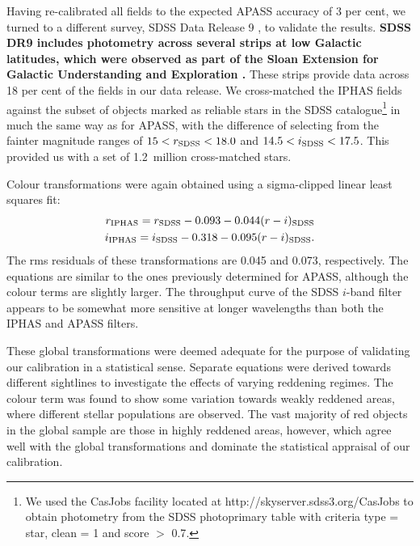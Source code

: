 \documentclass[a4paper,useAMS,usenatbib]{mn2e}
\begin{document}
Having re-calibrated all fields to the expected APASS accuracy of 3 per cent,
we turned to a different survey, SDSS Data Release 9 \citep{Ahn2012},
to validate the results.
{\bf SDSS DR9 includes photometry across several strips at low
Galactic latitudes,
which were observed as part of 
the Sloan Extension for Galactic Understanding and Exploration \citep[SEGUE;][]{segue}.}
These strips provide data across 18 per cent of the fields in our data release.
We cross-matched the IPHAS fields against the subset of
objects marked as reliable stars in the SDSS catalogue\footnote{
We used the CasJobs facility located at http://skyserver.sdss3.org/CasJobs
to obtain photometry from the SDSS {\sc photoprimary} table 
with criteria {\sc type = star}, {\sc clean = 1} and {\sc score $>$ 0.7}.}
in much the same way as for APASS,
with the difference of selecting from the  fainter magnitude ranges of 
$15<r_{\rm SDSS}<18.0$ and $14.5<i_{\rm SDSS}<17.5$.
This provided us with a set of 1.2~million cross-matched stars.

Colour transformations were again obtained using a sigma-clipped linear least squares fit:
\begin{eqnarray}
r_{\rm IPHAS} = r_{\rm SDSS} - 0.093 - 0.044(r-i)_{\rm SDSS} \label{eqn:sdss_r} \\
i_{\rm IPHAS} = i_{\rm SDSS} - 0.318 - 0.095(r-i)_{\rm SDSS}. \label{eqn:sdss_i}
\end{eqnarray}
The rms residuals of these transformations are 0.045 and 0.073, respectively.
The equations are similar to the ones
previously determined for APASS,
although the colour terms are slightly larger.
The throughput curve of the SDSS $i$-band filter 
appears to be somewhat more sensitive at longer wavelengths
than both the IPHAS and APASS filters.

These global transformations were deemed adequate
for the purpose of validating our calibration in a statistical sense.
Separate equations were derived towards different sightlines
to investigate the effects of varying reddening regimes.
The colour term was found 
to show some variation towards weakly reddened areas,
where different stellar populations are observed.
The vast majority of red objects in the global sample
are those in highly reddened areas, however,
which agree well with the global transformations
and dominate the statistical appraisal of our calibration.
\end{document}
